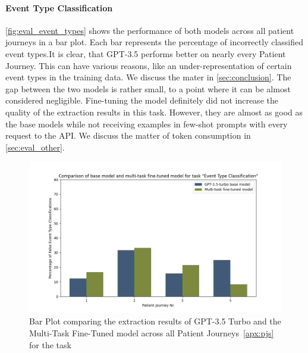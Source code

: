 \paragraph{Event Type Classification} \autoref{fig:eval_event_types} shows the performance of both models across all patient journeys in a bar plot. Each bar represents the percentage of incorrectly classified event types.It is clear, that GPT-3.5 performs better on nearly every Patient Journey. This can have various reasons, like an under-representation of certain event types in the training data. We discuss the mater in \autoref{sec:conclusion}. The gap between the two models is rather small, to a point where it can be almost considered negligible. Fine-tuning the model definitely did not increase the quality of the extraction results in this task. However, they are almost as good as the base models while not receiving examples in few-shot prompts with every request to the API. We discuss the matter of token consumption in \autoref{sec:eval_other}.
\begin{figure}
    \centering
    \includegraphics[width=\textwidth]{bachelor_thesis/images/event_types_all.png}
    \caption{Bar Plot comparing the extraction results of GPT-3.5 Turbo and the Multi-Task Fine-Tuned model across all Patient Journeys~\ref{apx:pjs} for the task }
    \label{fig:eval_event_types}
\end{figure}

